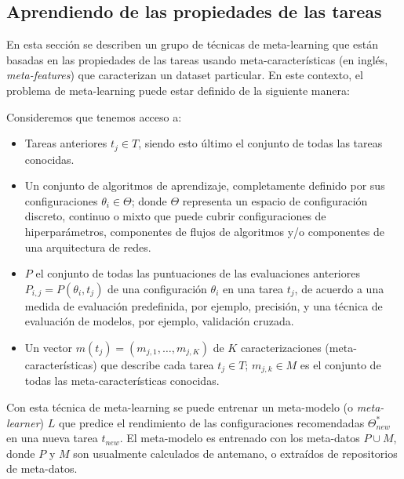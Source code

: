 \subsection{Aprendiendo de las propiedades de las tareas}\label{subsec:mtl_automl_proprerties}


En esta sección se describen un grupo de técnicas de meta-learning que están basadas en las propiedades de las tareas usando meta-características (en inglés, \textit{meta-features}) que caracterizan un dataset particular. En este contexto, el problema de meta-learning puede estar definido de la siguiente manera:

\begin{definition}
Consideremos que tenemos acceso a:

\begin{itemize}
	\item Tareas anteriores $t_j \in T$, siendo esto último el conjunto de todas las tareas conocidas.
	\item Un conjunto de algoritmos de aprendizaje, completamente definido por sus configuraciones $\theta_i \in \Theta$; donde $\Theta$ representa un espacio de configuración discreto, continuo o mixto que puede cubrir configuraciones de hiperparámetros, componentes de flujos de algoritmos y/o componentes de una arquitectura de redes.
	\item $P$ el conjunto de todas las puntuaciones de las evaluaciones anteriores $P_{i,j} = P(\theta_i, t_j)$ de una configuración $\theta_i$ en una tarea $t_j$, de acuerdo a una medida de evaluación predefinida, por ejemplo, precisión, y una técnica de evaluación de modelos, por ejemplo, validación cruzada. 
	\item Un vector $m(t_j) = (m_{j,1}, …, m_{j,K})$ de $K$ caracterizaciones (meta-características) que describe cada tarea $t_j \in T$; $m_{j,k} \in M$ es el conjunto de todas las meta-características conocidas.
\end{itemize}

Con esta técnica de meta-learning se puede entrenar un meta-modelo (o \textit{meta-learner}) $L$ que predice el rendimiento de las configuraciones recomendadas $\Theta^*_{new}$ en una nueva tarea $t_{new}$. El meta-modelo es entrenado con los meta-datos $P\cup M$, donde $P$ y $M$ son usualmente calculados de antemano, o extraídos de repositorios de meta-datos.

\end{definition}

